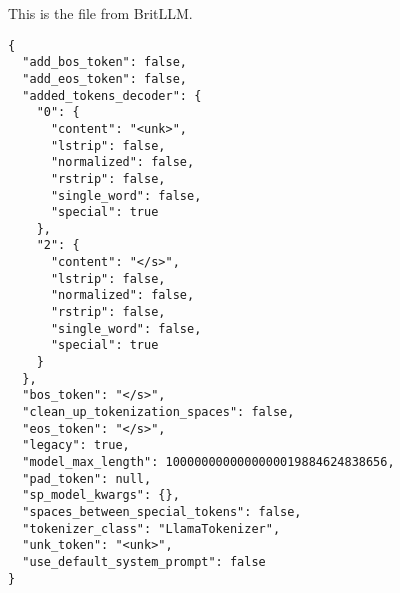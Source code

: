 \documentclass[11pt, a4paper]{article}
\begin{document}
This is the file  from BritLLM\@.
{\small
\begin{verbatim}
{
  "add_bos_token": false,
  "add_eos_token": false,
  "added_tokens_decoder": {
    "0": {
      "content": "<unk>",
      "lstrip": false,
      "normalized": false,
      "rstrip": false,
      "single_word": false,
      "special": true
    },
    "2": {
      "content": "</s>",
      "lstrip": false,
      "normalized": false,
      "rstrip": false,
      "single_word": false,
      "special": true
    }
  },
  "bos_token": "</s>",
  "clean_up_tokenization_spaces": false,
  "eos_token": "</s>",
  "legacy": true,
  "model_max_length": 1000000000000000019884624838656,
  "pad_token": null,
  "sp_model_kwargs": {},
  "spaces_between_special_tokens": false,
  "tokenizer_class": "LlamaTokenizer",
  "unk_token": "<unk>",
  "use_default_system_prompt": false
}
\end{verbatim}}
\end{document}
